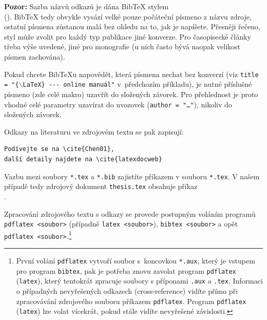 \documentclass[11pt,twoside,a4paper]{book}
\begin{document}
\textbf{Pozor:} Sazba názvů odkazů je dána Bib\TeX{} stylem\\ (\verb||). 
Bib\TeX{} tedy obvykle vysází velké pouze počáteční písmeno z názvu zdroje, 
ostatní písmena zůstanou malá bez ohledu na to, jak je napíšete. 
Přesněji řečeno, styl může zvolit pro každý typ publikace jiné konverze. 
Pro časopisecké články třeba výše uvedené, jiné pro monografie (u nich často bývá 
naopak velikost písmen zachována).

Pokud chcete Bib\TeX u napovědět, která písmena nechat bez konverzí 
(viz \texttt{title = "\{$\backslash$LaTeX\} -{}-{}- online manuál"} 
v~předchozím příkladu), je nutné příslušné písmeno (zde celé makro) uzavřít 
do složených závorek. Pro přehlednost je proto vhodné celé parametry 
uzavírat do uvozovek (\texttt{author = "\dots"}), nikoliv do složených závorek.

Odkazy na literaturu ve zdrojovém textu se pak zapisují:
\begin{verbatim}
Podívejte se na \cite{Chen01}, 
další detaily najdete na \cite{latexdocweb}
\end{verbatim}

Vazbu mezi soubory \verb|*.tex| a \verb|*.bib| zajistíte příkazem 
\verb|| v souboru \verb|*.tex|.  V našem případě tedy zdrojový 
dokument \verb|thesis.tex| obsahuje příkaz\\
\verb||.

Zpracování zdrojového textu s odkazy se provede postupným voláním programů\\
\verb|pdflatex <soubor>| (případně \verb|latex <soubor>|), \verb|bibtex <soubor>| 
a opět\\ \verb|pdflatex <soubor>|.\footnote{První volání \texttt{pdflatex} 
vytvoří soubor s~koncovkou \texttt{*.aux}, který je vstupem pro program 
\texttt{bibtex}, pak je potřeba znovu zavolat program \texttt{pdflatex} 
(\texttt{latex}), který tentokrát zpracuje soubory s příponami \texttt{.aux} a 
\texttt{.tex}. 
Informaci o případných nevyřešených odkazech (cross-reference) vidíte přímo při 
zpracovávání zdrojového souboru příkazem \texttt{pdflatex}. Program \texttt{pdflatex} 
(\texttt{latex}) lze volat vícekrát, pokud stále vidíte nevyřešené závislosti.}
\end{document}
